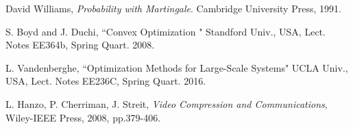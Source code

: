 \documentclass[journal,draftcls,onecolumn,12pt,twoside]{IEEEtran}
\begin{document}
\begin{thebibliography}{1}
David Williams, \emph{Probability with Martingale}. Cambridge University Press, 1991.

S. Boyd and J. Duchi, ``Convex Optimization \uppercase\expandafter{}" Standford Univ., USA, Lect. Notes EE364b, Spring Quart. 2008.

L. Vandenberghe, ``Optimization Methods for Large-Scale Systems" UCLA Univ., USA, Lect. Notes EE236C, Spring Quart. 2016.

L. Hanzo, P. Cherriman, J. Streit, \emph{Video Compression and Communications}, Wiley-IEEE Press, 2008, pp.379-406.

\end{thebibliography}
\end{document}
